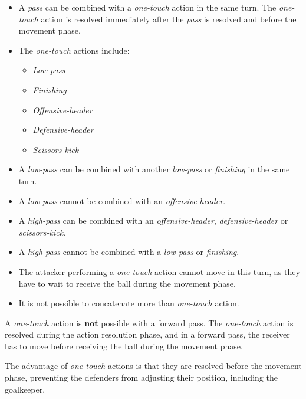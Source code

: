 \documentclass[12pt]{article}
\begin{document}
\begin{rulebox}
\begin{itemize}
\item A \emph{pass} can be combined with a\emph{ one-touch} action in the same turn. The\emph{ one-touch} action is resolved immediately after the \emph{pass }is resolved and before the movement phase.
\item The \emph{one-touch }actions include:
  \begin{itemize}
  \item \emph{Low-pass}
  \item \emph{Finishing}
  \item \emph{Offensive-header}
  \item \emph{Defensive-header}
  \item \emph{Scissors-kick}
  \end{itemize}
\end{itemize}

\begin{itemize}
\item A \emph{low-pass} can be combined with another \emph{low-pass} or \emph{finishing }in the same turn.
\item A \emph{low-pass} cannot be combined with an \emph{offensive-header}.
\item A \emph{high-pass} can be combined with an \emph{offensive-header}, \emph{defensive-header} or \emph{scissors-kick}.
\item A \emph{high-pass} cannot be combined with a \emph{low-pass} or \emph{finishing}.
\item The attacker performing a \emph{one-touch} action cannot move in this turn, as they have to wait to receive the ball during the movement phase.
\item It is not possible to concatenate more than \emph{one-touch} action.
\end{itemize}
\end{rulebox}

\begin{note}
A \emph{one-touch} action is \textbf{not} possible with a forward pass. The \emph{one-touch} action is resolved during the action resolution phase, and in a forward pass, the receiver has to move before receiving the ball during the movement phase.
\end{note}

\begin{hint}
The advantage of \emph{one-touch }actions is that they are resolved before the movement phase, preventing the defenders from adjusting their position, including the goalkeeper.
\end{hint}
\end{document}
